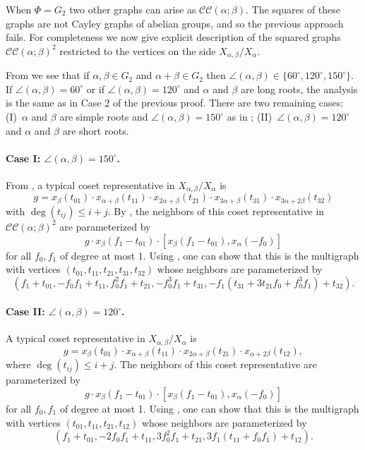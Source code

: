 \documentclass[11pt]{article}
\newcommand{\CC}[2]{\mathcal{C}\mathcal{C}(#1;#2)}
\begin{document}
\begin{remark}\label{g2graphs}
When $\Phi = G_2$ two other graphs can arise as $\CC{\alpha}{\beta}$. The squares of these graphs are not Cayley graphs of abelian groups, and so the previous approach fails. For completeness we now give explicit description of the squared graphs $\CC{\alpha}{\beta}^2$ restricted to the vertices on the side $X_{\alpha,\beta}/X_\alpha$.

From  we see that if $\alpha, \beta \in G_2$ and $\alpha+\beta \in G_2$ then $\angle(\alpha,\beta) \in \{60^\circ, 120^\circ,150^\circ\}$. If $\angle(\alpha,\beta) = 60^\circ$ or if $\angle(\alpha,\beta) = 120^\circ$ and $\alpha$ and $\beta$ are long roots, the analysis is the same as in Case 2 of the previous proof. There are two remaining cases: (I)~$\alpha$ and $\beta$ are simple roots and $\angle(\alpha,\beta) = 150^\circ$ as in ; (II)~$\angle(\alpha,\beta) = 120^\circ$ and $\alpha$ and $\beta$ are short roots.

\paragraph{Case I: $\angle(\alpha,\beta) = 150^\circ$.} 
From , a typical coset representative in $X_{\alpha,\beta}/X_\alpha$ is 
\[
    g=x_\beta(t_{01}) \cdot x_{\alpha+\beta}(t_{11})\cdot x_{2\alpha+\beta}(t_{21})\cdot x_{3\alpha+\beta}(t_{31}) \cdot x_{3\alpha+2\beta}(t_{32})
\]
with $\deg(t_{ij}) \leq i+j$. By , the neighbors of this coset representative in $\CC{\alpha}{\beta}^2$ are parameterized by
\[g \cdot  x_\beta(f_1-t_{01})\cdot  [x_\beta(f_1-t_{01}),x_\alpha(-f_0)]\]
for all $f_0,f_1$ of degree at most 1. Using , one can show that this is the multigraph with vertices $(t_{01},t_{11},t_{21},t_{31},t_{32})$ whose neighbors are parameterized by
\[(f_1+t_{01}, -f_0f_1+t_{11},f_0^2f_1+t_{21},-f_0^3f_1+t_{31},-f_1(t_{31}+3t_{21}f_0+f_0^3f_1 )+t_{32}).\]

\paragraph{Case II: $\angle(\alpha,\beta) = 120^\circ$.}
A typical coset representative in $X_{\alpha,\beta}/X_\alpha$ is \[g=x_{\beta}(t_{01})\cdot x_{\alpha+\beta}(t_{11})\cdot x_{2\alpha+\beta}(t_{21})\cdot x_{\alpha+2\beta}(t_{12}),\]
where $\deg(t_{ij}) \le i+j$. The neighbors of this coset representative are parameterized by
\[g \cdot x_{\beta}(f_1-t_{01}) \cdot [x_{\beta}(f_1-t_{01}), x_\alpha(-f_0)] \]
for all $f_0,f_1$ of degree at most 1. Using , one can show that this is the multigraph with vertices $(t_{01},t_{11},t_{21},t_{12})$ whose neighbors are parameterized by
\[(f_1+t_{01},-2f_0f_1+t_{11},3f_0^2f_1+t_{21},3f_1(t_{11}+f_0f_1)+t_{12}).\]
\end{remark}
\end{document}

